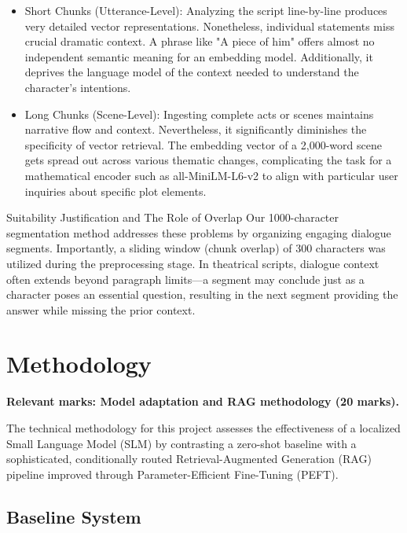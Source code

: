 \documentclass[10pt,conference]{IEEEtran}
\begin{document}
\begin{itemize}
    \item Short Chunks (Utterance-Level): Analyzing the script line-by-line produces very detailed vector representations. Nonetheless, individual statements miss crucial dramatic context. A phrase like "A piece of him" offers almost no independent semantic meaning for an embedding model. Additionally, it deprives the language model of the context needed to understand the character's intentions.

    \item Long Chunks (Scene-Level): Ingesting complete acts or scenes maintains narrative flow and context. Nevertheless, it significantly diminishes the specificity of vector retrieval. The embedding vector of a 2,000-word scene gets spread out across various thematic changes, complicating the task for a mathematical encoder such as all-MiniLM-L6-v2 to align with particular user inquiries about specific plot elements.
\end{itemize}

Suitability Justification and The Role of Overlap Our 1000-character segmentation method addresses these problems by organizing engaging dialogue segments. Importantly, a sliding window (chunk overlap) of 300 characters was utilized during the preprocessing stage.
In theatrical scripts, dialogue context often extends beyond paragraph limits—a segment may conclude just as a character poses an essential question, resulting in the next segment providing the answer while missing the prior context.

\section{Methodology}
\label{sec:methodology}

\textbf{Relevant marks: Model adaptation and RAG methodology (20 marks).}

The technical methodology for this project assesses the effectiveness of a localized Small Language Model (SLM) by contrasting a zero-shot baseline with a sophisticated, conditionally routed Retrieval-Augmented Generation (RAG) pipeline improved through Parameter-Efficient Fine-Tuning (PEFT).

\subsection{Baseline System}
\end{document}
